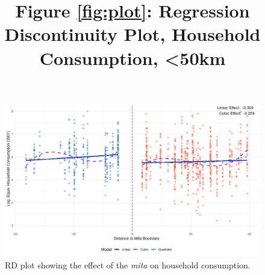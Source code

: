 \documentclass[12pt]{article}
\begin{document}
\begin{figure}[H]
\centering
\title{Figure \ref{fig:plot}: Regression Discontinuity Plot, Household Consumption, \textless 50km}\par\medskip
\includegraphics[width=1\linewidth]{figures/rd_plot.png}
\caption{\label{fig:plot}RD plot showing the effect of the \emph{mita} on household consumption.}
\end{figure}
\end{document}
